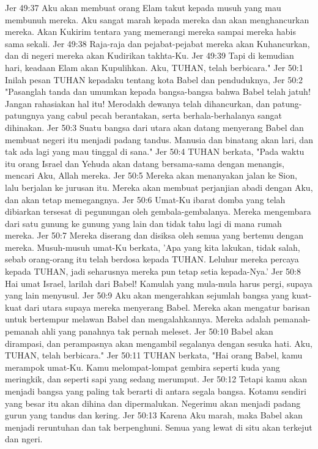 Jer 49:37  Aku akan membuat orang Elam takut kepada musuh yang mau membunuh mereka. Aku sangat marah kepada mereka dan akan menghancurkan mereka. Akan Kukirim tentara yang memerangi mereka sampai mereka habis sama sekali.
Jer 49:38  Raja-raja dan pejabat-pejabat mereka akan Kuhancurkan, dan di negeri mereka akan Kudirikan takhta-Ku.
Jer 49:39  Tapi di kemudian hari, keadaan Elam akan Kupulihkan. Aku, TUHAN, telah berbicara."
Jer 50:1  Inilah pesan TUHAN kepadaku tentang kota Babel dan penduduknya,
Jer 50:2  "Pasanglah tanda dan umumkan kepada bangsa-bangsa bahwa Babel telah jatuh! Jangan rahasiakan hal itu! Merodakh dewanya telah dihancurkan, dan patung-patungnya yang cabul pecah berantakan, serta berhala-berhalanya sangat dihinakan.
Jer 50:3  Suatu bangsa dari utara akan datang menyerang Babel dan membuat negeri itu menjadi padang tandus. Manusia dan binatang akan lari, dan tak ada lagi yang mau tinggal di sana."
Jer 50:4  TUHAN berkata, "Pada waktu itu orang Israel dan Yehuda akan datang bersama-sama dengan menangis, mencari Aku, Allah mereka.
Jer 50:5  Mereka akan menanyakan jalan ke Sion, lalu berjalan ke jurusan itu. Mereka akan membuat perjanjian abadi dengan Aku, dan akan tetap memegangnya.
Jer 50:6  Umat-Ku ibarat domba yang telah dibiarkan tersesat di pegunungan oleh gembala-gembalanya. Mereka mengembara dari satu gunung ke gunung yang lain dan tidak tahu lagi di mana rumah mereka.
Jer 50:7  Mereka diserang dan disiksa oleh semua yang bertemu dengan mereka. Musuh-musuh umat-Ku berkata, 'Apa yang kita lakukan, tidak salah, sebab orang-orang itu telah berdosa kepada TUHAN. Leluhur mereka percaya kepada TUHAN, jadi seharusnya mereka pun tetap setia kepada-Nya.'
Jer 50:8  Hai umat Israel, larilah dari Babel! Kamulah yang mula-mula harus pergi, supaya yang lain menyusul.
Jer 50:9  Aku akan mengerahkan sejumlah bangsa yang kuat-kuat dari utara supaya mereka menyerang Babel. Mereka akan mengatur barisan untuk bertempur melawan Babel dan mengalahkannya. Mereka adalah pemanah-pemanah ahli yang panahnya tak pernah meleset.
Jer 50:10  Babel akan dirampasi, dan perampasnya akan mengambil segalanya dengan sesuka hati. Aku, TUHAN, telah berbicara."
Jer 50:11  TUHAN berkata, "Hai orang Babel, kamu merampok umat-Ku. Kamu melompat-lompat gembira seperti kuda yang meringkik, dan seperti sapi yang sedang merumput.
Jer 50:12  Tetapi kamu akan menjadi bangsa yang paling tak berarti di antara segala bangsa. Kotamu sendiri yang besar itu akan dihina dan dipermalukan. Negerimu akan menjadi padang gurun yang tandus dan kering.
Jer 50:13  Karena Aku marah, maka Babel akan menjadi reruntuhan dan tak berpenghuni. Semua yang lewat di situ akan terkejut dan ngeri.
